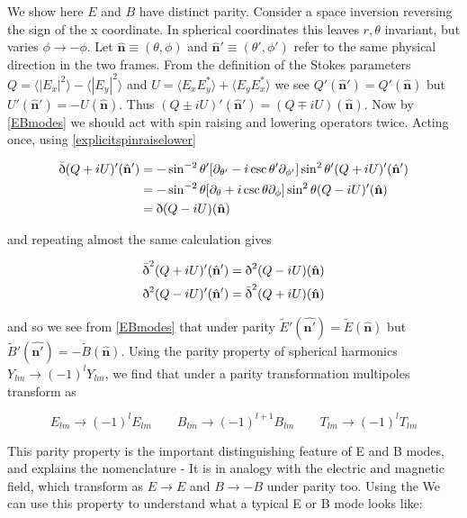 \documentclass[a4paper,10pt]{article}
\renewcommand{\v}[1]{\mathbf{#1}}
\newcommand{\unit}[1]{\hat{\v{#1}}}
\newcommand{\sr}{\text{\normalfont\dh}}
\renewcommand{\sl}{\bar{\text{\normalfont\dh}}}
\begin{document}
We show here $E$ and $B$ have distinct parity. Consider a space inversion reversing the sign of the x coordinate. In spherical coordinates this leaves $r, \theta$ invariant, but varies $\phi \rightarrow -\phi$.  Let $\unit{n}\equiv(\theta, \phi)$ and $\unit{n}'\equiv(\theta', \phi')$ refer to the same physical direction in the two frames. From the definition of the Stokes parameters $Q=\langle |E_x|^2 \rangle - \langle |E_y|^2 \rangle$ and $U = \langle E_xE_y^* \rangle + \langle E_yE_x^* \rangle$ we see $Q'(\unit{n}') = Q'(\unit{n})$ but $U'(\unit{n}') = -U(\unit{n})$. Thus $(Q\pm iU)'(\unit{n}') = (Q\mp iU)(\unit{n})$. Now by \ref{EBmodes} we should act with spin raising and lowering operators twice. Acting once, using \ref{explicitspinraiselower}

\begin{equation}\begin{split}
\sl(Q+iU)'(\unit{n}') &= -\sin^{-2}{\theta'}[\partial_{\theta'}-i\csc{\theta'}\partial_{\phi'}]\sin^{2}{\theta'}(Q+iU)'(\unit{n}')\\
&= -\sin^{-2}{\theta}[\partial_{\theta}+i\csc{\theta}\partial_{\phi}]\sin^{2}{\theta}(Q-iU)'(\unit{n})\\
&= \sr (Q-iU)(\unit{n})
\end{split}\end{equation}

and repeating almost the same calculation gives 

\begin{equation}\begin{split}
\sl^2(Q+iU)'(\unit{n}') = \sr^2 (Q-iU)(\unit{n})\\
\sr^2(Q-iU)'(\unit{n}') = \sl^2 (Q+iU)(\unit{n})
\end{split}\end{equation}

and so we see from \ref{EBmodes} that under parity $\tilde{E}'(\unit{n'})=\tilde{E}(\unit{n})$ but $\tilde{B}'(\unit{n'})=-\tilde{B}(\unit{n})$. Using the parity property of spherical harmonics $Y_{lm}\rightarrow(-1)^lY_{lm}$, we find that under a parity transformation multipoles transform as

\begin{equation}
E_{lm} \rightarrow (-1)^lE_{lm} \qquad B_{lm} \rightarrow (-1)^{l+1}B_{lm} \qquad T_{lm} \rightarrow (-1)^lT_{lm}
\end{equation} 

This parity property is the important distinguishing feature of E and B modes, and explains the nomenclature - It is in analogy with the electric and magnetic field, which transform as $E\rightarrow E$ and $B\rightarrow -B$ under parity too. Using the We can use this property to understand what a typical E or B mode looks like:
\end{document}
